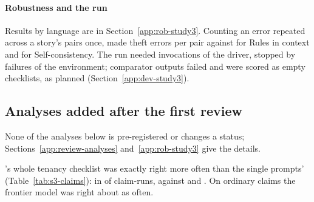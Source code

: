 \paragraph{Robustness and the run}
Results by language are in Section~\ref{app:rob-study3}. Counting an error repeated across a story's pairs once, \casepath made \sthreeCasePathThErrorsDedup{} theft errors per pair against \sthreeRicThErrorsDedup{} for Rules in context and \sthreeSelfConsThErrorsDedup{} for Self-consistency. The run needed \sthreeRunInvocations{} invocations of the driver, \sthreeRunFailureStops{} stopped by failures of the environment; \sthreeRunFailedOutputs{} comparator outputs failed and were scored as empty checklists, as planned (Section~\ref{app:dev-study3}).

\subsection{Analyses added after the first review}
\label{sec:test-review}

None of the analyses below is pre-registered or changes a status; Sections~\ref{app:review-analyses} and~\ref{app:rob-study3} give the details.

\casepath's whole tenancy checklist was exactly right more often than the single prompts' (Table~\ref{tab:s3-claims}): in \sthreeROneCasePathAllExact{} of claim-runs, against \sthreeROneRicAllExact{} and \sthreeROneRicFrontierAllExact. On ordinary claims the frontier model was right about as often.


